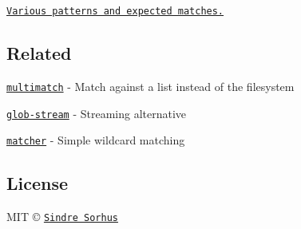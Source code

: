 \href{https://github.com/sindresorhus/multimatch/blob/master/test.js}{\tt Various patterns and expected matches.}

\subsection*{Related}


\begin{DoxyItemize}
\item \href{https://github.com/sindresorhus/multimatch}{\tt multimatch} -\/ Match against a list instead of the filesystem
\item \href{https://github.com/wearefractal/glob-stream}{\tt glob-\/stream} -\/ Streaming alternative
\item \href{https://github.com/sindresorhus/matcher}{\tt matcher} -\/ Simple wildcard matching
\end{DoxyItemize}

\subsection*{License}

M\+IT © \href{https://sindresorhus.com}{\tt Sindre Sorhus} 